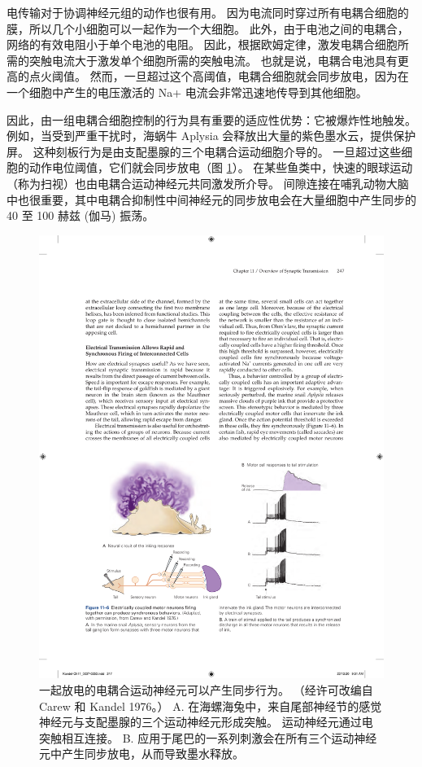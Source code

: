 电传输对于协调神经元组的动作也很有用。 
因为电流同时穿过所有电耦合细胞的膜，所以几个小细胞可以一起作为一个大细胞。 
此外，由于电池之间的电耦合，网络的有效电阻小于单个电池的电阻。 
因此，根据欧姆定律，激发电耦合细胞所需的突触电流大于激发单个细胞所需的突触电流。 
也就是说，电耦合电池具有更高的点火阈值。 
然而，一旦超过这个高阈值，电耦合细胞就会同步放电，因为在一个细胞中产生的电压激活的 Na+ 电流会非常迅速地传导到其他细胞。


因此，由一组电耦合细胞控制的行为具有重要的适应性优势：它被爆炸性地触发。 
例如，当受到严重干扰时，海蜗牛 Aplysia 会释放出大量的紫色墨水云，提供保护屏。 
这种刻板行为是由支配墨腺的三个电耦合运动细胞介导的。 一旦超过这些细胞的动作电位阈值，它们就会同步放电（图 \ref{fig:11_6}）。 
在某些鱼类中，快速的眼球运动（称为扫视）也由电耦合运动神经元共同激发所介导。 
间隙连接在哺乳动物大脑中也很重要，其中电耦合抑制性中间神经元的同步放电会在大量细胞中产生同步的 40 至 100 赫兹 (伽马) 振荡。

\begin{figure}[htbp]
	\centering
	\includegraphics[width=0.8\linewidth]{chap11/fig_11_6}
	\caption{一起放电的电耦合运动神经元可以产生同步行为。 （经许可改编自 Carew 和 Kandel 1976。） A. 在海螺海兔中，来自尾部神经节的感觉神经元与支配墨腺的三个运动神经元形成突触。 运动神经元通过电突触相互连接。 B. 应用于尾巴的一系列刺激会在所有三个运动神经元中产生同步放电，从而导致墨水释放。}
	\label{fig:11_6}
\end{figure}


